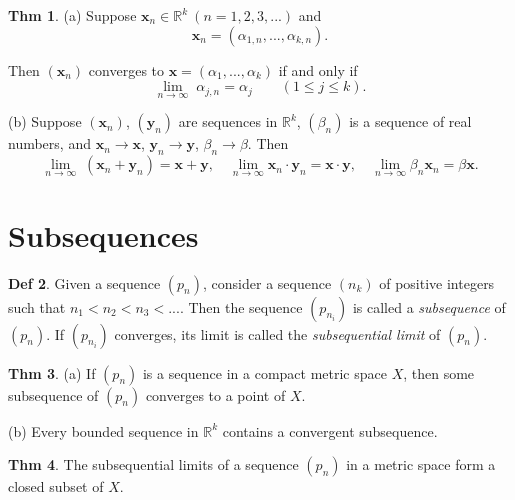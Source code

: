 \documentclass{article}
\theoremstyle{definition}
\newtheorem{definition}{Def}
\newtheorem{theorem}[definition]{Thm}
\begin{document}
\begin{theorem}
    \leavevmode\par
    (a) Suppose $\mathbf{x}_n\in\mathbb{R}^k\:(n=1,2,3,...)$ and
    \[
    \mathbf{x}_n=(\alpha_{1,n},...,\alpha_{k,n}).
    \]\par
    Then $(\mathbf{x}_n)$ converges to $\mathbf{x}=(\alpha_1,...,\alpha_k)$ if and only if
    \[
    \lim_{n\to\infty}\;\alpha_{j,n}=\alpha_j\qquad(1\leq j\leq k).
    \]\par
    (b) Suppose $(\mathbf{x}_n)$, $(\mathbf{y}_n)$ are sequences in $\mathbb{R}^k$, $(\beta_n)$ is a sequence of real numbers, and $\mathbf{x}_n\to\mathbf{x}$, $\mathbf{y}_n\to\mathbf{y}$, $\beta_n\to\beta$. Then
    \[
    \lim_{n\to\infty}\;(\mathbf{x}_n+\mathbf{y}_n)=\mathbf{x}+\mathbf{y},\quad\lim_{n\to\infty}\mathbf{x}_n\cdot\mathbf{y}_n=\mathbf{x}\cdot\mathbf{y},\quad\lim_{n\to\infty}\beta_n\mathbf{x}_n=\beta\mathbf{x}.
    \]
\end{theorem}

\section{Subsequences}
\begin{definition}
    Given a sequence $(p_n)$, consider a sequence $(n_k)$ of positive integers such that $n_1<n_2<n_3<...$. Then the sequence $(p_{n_i})$ is called a \textit{subsequence} of $(p_n)$. If $(p_{n_i})$ converges, its limit is called the \textit{subsequential limit} of $(p_n)$.
\end{definition}
\begin{theorem}
    \leavevmode\par
    (a) If $(p_n)$ is a sequence in a compact metric space $X$, then some subsequence of $(p_n)$ converges to a point of $X$.\par
    (b) Every bounded sequence in $\mathbb{R}^k$ contains a convergent subsequence.
\end{theorem}
\begin{theorem}
    The subsequential limits of a sequence $(p_n)$ in a metric space form a closed subset of $X$.
\end{theorem}
\end{document}
